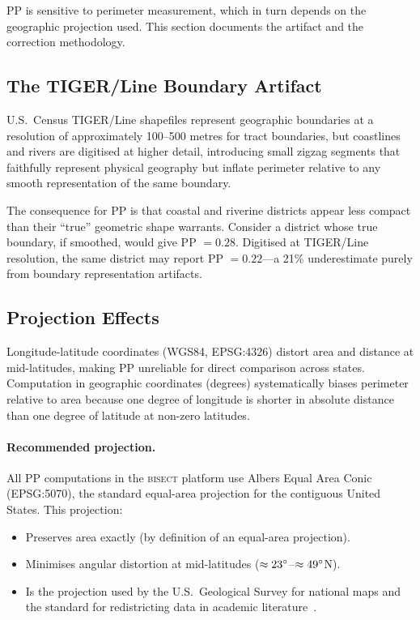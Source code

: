 PP is sensitive to perimeter measurement, which in turn depends on the
geographic projection used. This section documents the artifact and the
correction methodology.

\subsection{The TIGER/Line Boundary Artifact}

U.S.\ Census TIGER/Line shapefiles represent geographic boundaries at a
resolution of approximately 100--500 metres for tract boundaries, but coastlines
and rivers are digitised at higher detail, introducing small zigzag segments
that faithfully represent physical geography but inflate perimeter relative
to any smooth representation of the same boundary.

The consequence for PP is that coastal and riverine districts appear less compact
than their ``true'' geometric shape warrants.
Consider a district whose true boundary, if smoothed, would give PP $= 0.28$.
Digitised at TIGER/Line resolution, the same district may report PP $= 0.22$---a
21\% underestimate purely from boundary representation artifacts.

\subsection{Projection Effects}

Longitude-latitude coordinates (WGS84, EPSG:4326) distort area and distance
at mid-latitudes, making PP unreliable for direct comparison across states.
Computation in geographic coordinates (degrees) systematically biases perimeter
relative to area because one degree of longitude is shorter in absolute distance
than one degree of latitude at non-zero latitudes.

\paragraph{Recommended projection.}
All PP computations in the \textsc{bisect} platform use Albers Equal Area Conic
(EPSG:5070), the standard equal-area projection for the contiguous United States.
This projection:
\begin{itemize}
  \item Preserves area exactly (by definition of an equal-area projection).
  \item Minimises angular distortion at mid-latitudes ($\approx 23\degree$--$\approx 49\degree$N).
  \item Is the projection used by the U.S.\ Geological Survey for national maps
    and the standard for redistricting data in academic literature~\citep{census2020tiger}.
\end{itemize}

